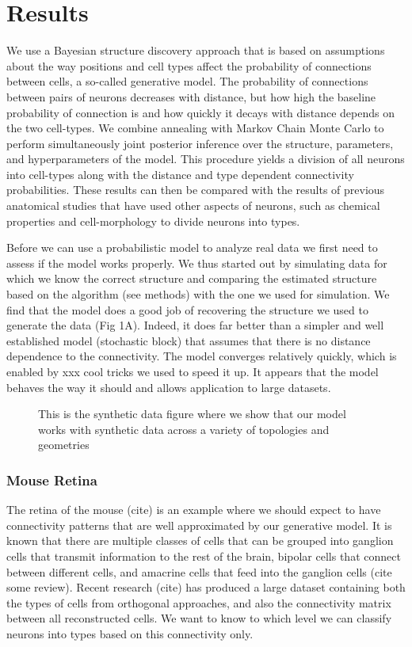 \documentclass{article}
\begin{document}
\section{Results}
We use a Bayesian structure discovery approach that is based on assumptions about the way positions and cell types affect the probability of connections between cells,  a so-called generative model. The probability of connections between pairs of neurons decreases with distance, but how high the baseline probability of connection is and how quickly it decays with distance depends on the two cell-types. We combine annealing with Markov Chain Monte Carlo to perform simultaneously joint posterior inference over the structure, parameters, and hyperparameters of the model. This procedure yields a division of all neurons into cell-types along with the distance and type dependent connectivity probabilities. These results can then be compared with the results of previous anatomical studies that have used other aspects of neurons, such as chemical properties and cell-morphology to divide neurons into types.

Before we can use a probabilistic model to analyze real data we first need to assess if the model works properly. We thus started out by simulating data for which we know the correct structure and comparing the estimated structure based on the algorithm (see methods) with the one we used for simulation. We find that the model does a good job of recovering the structure we used to generate the data (Fig 1A). Indeed, it does far better than a simpler and well established model (stochastic block) that assumes that there is no distance dependence to the connectivity. The model converges relatively quickly, which is enabled by xxx cool tricks we used to speed it up. It appears that the model behaves the way it should and allows application to large datasets.

\begin{figure}
  \centering 
  \caption{This is the synthetic data figure where we show that our model works with synthetic data across a variety of topologies and geometries}
\end{figure}

\subsubsection{Mouse Retina}
The retina of the mouse (cite) is an example where we should expect to have connectivity patterns that are well approximated by our generative model. It is known that there are multiple classes of cells that can be grouped into ganglion cells that transmit information to the rest of the brain, bipolar cells that connect between different cells, and amacrine cells that feed into the ganglion cells (cite some review). Recent research (cite) has produced a large dataset containing both the types of cells from orthogonal approaches, and also the connectivity matrix between all reconstructed cells. We want to know to which level we can classify neurons into types based on this connectivity only.
\end{document}
